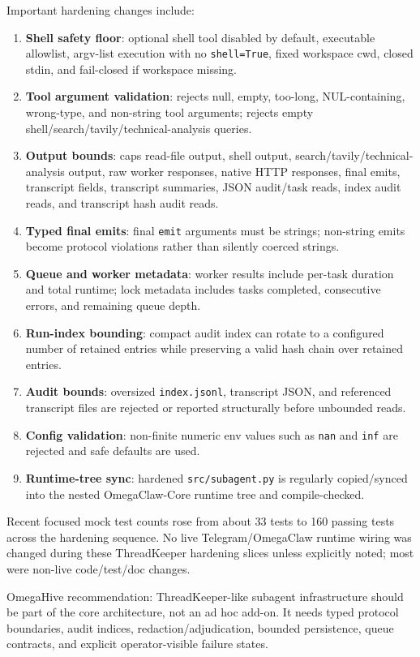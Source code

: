 \documentclass[11pt]{article}
\begin{document}
Important hardening changes include:
\begin{enumerate}[label=\arabic*.]
  \item \textbf{Shell safety floor}: optional shell tool disabled by default, executable allowlist, argv-list execution with no \texttt{shell=True}, fixed workspace cwd, closed stdin, and fail-closed if workspace missing.
  \item \textbf{Tool argument validation}: rejects null, empty, too-long, NUL-containing, wrong-type, and non-string tool arguments; rejects empty shell/search/tavily/technical-analysis queries.
  \item \textbf{Output bounds}: caps read-file output, shell output, search/tavily/technical-analysis output, raw worker responses, native HTTP responses, final emits, transcript fields, transcript summaries, JSON audit/task reads, index audit reads, and transcript hash audit reads.
  \item \textbf{Typed final emits}: final \texttt{emit} arguments must be strings; non-string emits become protocol violations rather than silently coerced strings.
  \item \textbf{Queue and worker metadata}: worker results include per-task duration and total runtime; lock metadata includes tasks completed, consecutive errors, and remaining queue depth.
  \item \textbf{Run-index bounding}: compact audit index can rotate to a configured number of retained entries while preserving a valid hash chain over retained entries.
  \item \textbf{Audit bounds}: oversized \texttt{index.jsonl}, transcript JSON, and referenced transcript files are rejected or reported structurally before unbounded reads.
  \item \textbf{Config validation}: non-finite numeric env values such as \texttt{nan} and \texttt{inf} are rejected and safe defaults are used.
  \item \textbf{Runtime-tree sync}: hardened \texttt{src/subagent.py} is regularly copied/synced into the nested OmegaClaw-Core runtime tree and compile-checked.
\end{enumerate}

Recent focused mock test counts rose from about 33 tests to 160 passing tests across the hardening sequence.  No live Telegram/OmegaClaw runtime wiring was changed during these ThreadKeeper hardening slices unless explicitly noted; most were non-live code/test/doc changes.

OmegaHive recommendation: ThreadKeeper-like subagent infrastructure should be part of the core architecture, not an ad hoc add-on.  It needs typed protocol boundaries, audit indices, redaction/adjudication, bounded persistence, queue contracts, and explicit operator-visible failure states.
\end{document}
